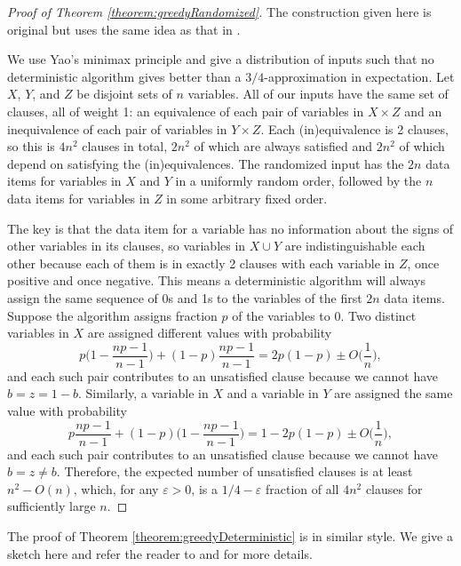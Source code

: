 \documentclass[11pt,letter]{article}
\numberwithin{theorem}{section}
\renewcommand{\epsilon}{\varepsilon}
\begin{document}
\begin{proof}[Proof of Theorem \ref{theorem:greedyRandomized}]
  The construction given here is original
  but uses the same idea as that in \cite{DBLP:conf/esa/Poloczek11}.

  We use Yao's minimax principle \cite{Yao}
  and give a distribution of inputs
  such that no deterministic algorithm gives better than a $3/4$-approximation
  in expectation.
  Let $X$, $Y$, and $Z$ be disjoint sets of $n$ variables.
  All of our inputs have the same set of clauses, all of weight 1:
  an equivalence of each pair of variables in $X \times Z$
  and an inequivalence of each pair of variables in $Y \times Z$.
  Each (in)equivalence is 2 clauses, so this is $4n^2$ clauses in total,
  $2n^2$ of which are always satisfied
  and $2n^2$ of which depend on satisfying the (in)equivalences.
  The randomized input has the $2n$ data items for variables in $X$ and $Y$
  in a uniformly random order,
  followed by the $n$ data items for variables in $Z$
  in some arbitrary fixed order.

  The key is that the data item for a variable has no information about
  the signs of other variables in its clauses,
  so variables in $X \cup Y$ are indistinguishable each other
  because each of them is in exactly 2 clauses with each variable in $Z$,
  once positive and once negative.
  This means a deterministic algorithm will always assign
  the same sequence of 0s and 1s
  to the variables of the first $2n$ data items.
  Suppose the algorithm assigns fraction $p$ of the variables to 0.
  Two distinct variables in $X$ are assigned different values
  with probability
  \[
    p\bigg(1-\frac{np-1}{n-1}\bigg) + (1-p)\frac{np-1}{n-1}
    = 2p(1-p) \pm O\bigg(\frac{1}{n}\bigg),
  \]
  and each such pair contributes to an unsatisfied clause
  because we cannot have $b = z = 1-b$.
  Similarly, a variable in $X$ and a variable in $Y$
  are assigned the same value with probability
  \[
    p\frac{np-1}{n-1} + (1-p)\bigg(1-\frac{np-1}{n-1}\bigg)
    = 1 - 2p(1-p) \pm O\bigg(\frac{1}{n}\bigg),
  \]
  and each such pair contributes to an unsatisfied clause
  because we cannot have $b = z \neq b$.
  Therefore, the expected number of unsatisfied clauses
  is at least $n^2 - O(n)$,
  which, for any $\epsilon > 0$,
  is a $1/4 - \epsilon$ fraction of all $4n^2$ clauses
  for sufficiently large $n$.
\end{proof}

The proof of Theorem \ref{theorem:greedyDeterministic} is in similar style.
We give a sketch here and refer the reader
to \cite{PoloczekVideo} and \cite{DBLP:conf/esa/Poloczek11} for more details.
\end{document}
